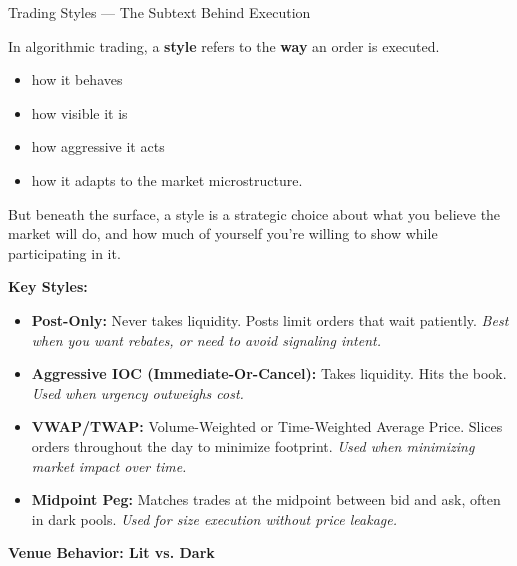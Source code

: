 \begin{TechnicalSidebar}{Trading Styles — The Subtext Behind Execution}

    In algorithmic trading, a \textbf{style} refers to the \textbf{way} an order is executed.

    \medskip
    
    \begin{itemize}
        \item how it behaves 
        \item how visible it is 
        \item how aggressive it acts
        \item how it adapts to the market microstructure.
    \end{itemize}

    \medskip
    
    But beneath the surface, a style is a strategic choice about what you believe the market will do, 
    and how much of yourself you’re willing to show while participating in it.
    
    \medskip
    
    \textbf{Key Styles:}

    \medskip
    
    \begin{itemize}
      \item \textbf{Post-Only:}  
      Never takes liquidity. Posts limit orders that wait patiently.  
      \textit{Best when you want rebates, or need to avoid signaling intent.}
    
      \item \textbf{Aggressive IOC (Immediate-Or-Cancel):}  
      Takes liquidity. Hits the book.  
      \textit{Used when urgency outweighs cost.}
    
      \item \textbf{VWAP/TWAP:}  
      Volume-Weighted or Time-Weighted Average Price. Slices orders throughout the day to minimize footprint.  
      \textit{Used when minimizing market impact over time.}
    
      \item \textbf{Midpoint Peg:}  
      Matches trades at the midpoint between bid and ask, often in dark pools.  
      \textit{Used for size execution without price leakage.}
    \end{itemize}
    
    \medskip
    
    
    \textbf{Venue Behavior: Lit vs. Dark}


\end{TechnicalSidebar}
